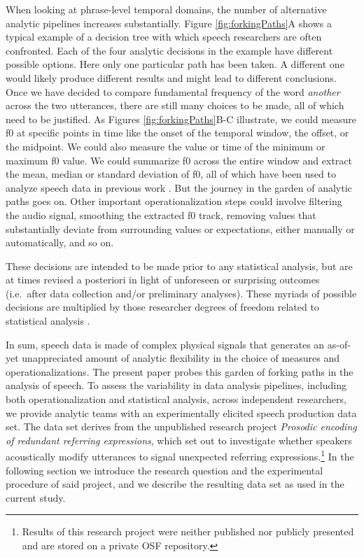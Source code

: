 \documentclass[Review,times,sageh]{sagej}
\begin{document}
When looking at phrase-level temporal domains, the number of alternative analytic pipelines increases substantially.
Figure \ref{fig:forkingPaths}A shows a typical example of a decision tree with which speech researchers are often confronted.
Each of the four analytic decisions in the example have different possible options.
Here only one particular path has been taken. A different one would likely produce different results and might lead to different conclusions.
Once we have decided to compare fundamental frequency of the word \emph{another} across the two utterances, there are still many choices to be made, all of which need to be justified.
As Figures \ref{fig:forkingPaths}B-C illustrate, we could measure f0 at specific points in time like the onset of the temporal window, the offset, or the midpoint.
We could also measure the value or time of the minimum or maximum f0 value.
We could summarize f0 across the entire window and extract the mean, median or standard deviation of f0, all of which have been used to analyze speech data in previous work \citep[see][]{gordon2017acoustic}.
But the journey in the garden of analytic paths goes on.
Other important operationalization steps could involve filtering the audio signal, smoothing the extracted f0 track, removing values that substantially deviate from surrounding values or expectations, either manually or automatically, and so on.

These decisions are intended to be made prior to any statistical analysis, but are at times revised a posteriori in light of unforeseen or surprising outcomes (i.e.~after data collection and/or preliminary analyses).
These myriads of possible decisions are multiplied by those researcher degrees of freedom related to statistical analysis \citep[e.g.][]{wicherts2016}.

In sum, speech data is made of complex physical signals that generates an as-of-yet unappreciated amount of analytic flexibility in the choice of measures and operationalizations.
The present paper probes this garden of forking paths in the analysis of speech.
To assess the variability in data analysis pipelines, including both operationalization and statistical analysis, across independent researchers, we provide analytic teams with an experimentally elicited speech production data set.
The data set derives from the unpublished research project \emph{Prosodic encoding of redundant referring expressions}, which set out to investigate whether speakers acoustically modify utterances to signal unexpected referring expressions.\footnote{Results of this research project were neither published nor publicly presented and are stored on a private OSF repository.}
In the following section we introduce the research question and the experimental procedure of said project, and we describe the resulting data set as used in the current study.
\end{document}
